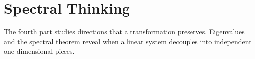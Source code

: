 \part{Spectral Thinking}

The fourth part studies directions that a transformation preserves. Eigenvalues
and the spectral theorem reveal when a linear system decouples into independent
one-dimensional pieces.
